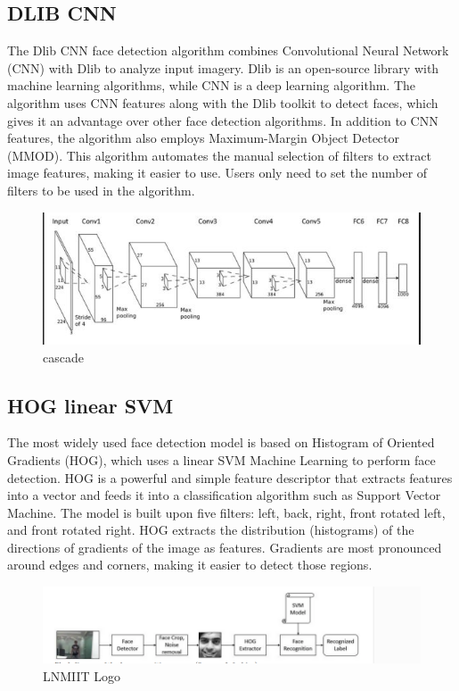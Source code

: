 \subsection{DLIB CNN}
The Dlib CNN face detection algorithm combines Convolutional Neural Network (CNN) with Dlib to analyze input imagery. Dlib is an open-source library with machine learning algorithms, while CNN is a deep learning algorithm. The algorithm uses CNN features along with the Dlib toolkit to detect faces, which gives it an advantage over other face detection algorithms. In addition to CNN features, the algorithm also employs Maximum-Margin Object Detector (MMOD). This algorithm automates the manual selection of filters to extract image features, making it easier to use. Users only need to set the number of filters to be used in the algorithm.
\begin{figure}[!htb]
    \centering
    \includegraphics[width=\linewidth,height=0.2\linewidth]{Figures/Ch01/CNN.png}
    \caption{cascade}
    \label{figure:cascade}
    \end{figure}

\subsection{HOG linear SVM}
The most widely used face detection model is based on Histogram of Oriented Gradients (HOG), which uses a linear SVM Machine Learning to perform face detection. HOG is a powerful and simple feature descriptor that extracts features into a vector and feeds it into a classification algorithm such as Support Vector Machine. The model is built upon five filters: left, back, right, front rotated left, and front rotated right. HOG extracts the distribution (histograms) of the directions of gradients of the image as features. Gradients are most pronounced around edges and corners, making it easier to detect those regions.
\begin{figure}[h]
\centering
\includegraphics[width=\linewidth]{Figures/Ch01/sv.png}
\caption{LNMIIT Logo }
\label{figure:1}
\end{figure}
\clearpage
